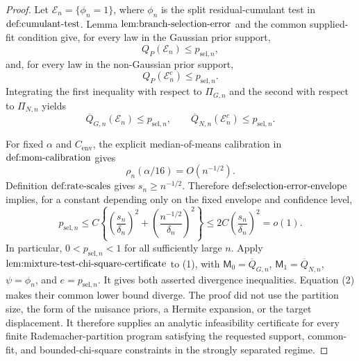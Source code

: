 \documentclass{article}
\begin{document}
\begin{proof}
Let \(\mathcal E_n=\{\phi_n=1\}\), where \(\phi_n\) is the split residual-cumulant test in \(\textup{def:cumulant-test}\).  Lemma \(\textup{lem:branch-selection-error}\) and the common supplied-fit condition give, for every law in the Gaussian prior support,
\[
 Q_P(\mathcal E_n)\le p_{\mathrm{sel},n},
\]
and, for every law in the non-Gaussian prior support,
\[
 Q_P(\mathcal E_n^c)\le p_{\mathrm{sel},n}.
\]
Integrating the first inequality with respect to \(\Pi_{G,n}\) and the second with respect to \(\Pi_{N,n}\) yields
\[
 \overline Q_{G,n}(\mathcal E_n)\le p_{\mathrm{sel},n},
 \qquad
 \overline Q_{N,n}(\mathcal E_n^c)\le p_{\mathrm{sel},n}.
\tag{1}
\]

For fixed \(\alpha\) and \(C_{\mathrm{env}}\), the explicit median-of-means calibration in \(\textup{def:mom-calibration}\) gives
\[
 \rho_n(\alpha/16)=O(n^{-1/2}).
\]
Definition \(\textup{def:rate-scales}\) gives \(s_n\ge n^{-1/2}\).  Therefore \(\textup{def:selection-error-envelope}\) implies, for a constant depending only on the fixed envelope and confidence level,
\[
 p_{\mathrm{sel},n}
 \le C\left\{
 \left(\frac{s_n}{\delta_n}\right)^2
 + \left(\frac{n^{-1/2}}{\delta_n}\right)^2
 \right\}
 \le 2C\left(\frac{s_n}{\delta_n}\right)^2
 =o(1).
\tag{2}
\]
In particular, \(0<p_{\mathrm{sel},n}<1\) for all sufficiently large \(n\).  Apply \(\textup{lem:mixture-test-chi-square-certificate}\) to (1), with \(\mathsf M_0=\overline Q_{G,n}\), \(\mathsf M_1=\overline Q_{N,n}\), \(\psi=\phi_n\), and \(e=p_{\mathrm{sel},n}\).  It gives both asserted divergence inequalities.  Equation (2) makes their common lower bound diverge.  The proof did not use the partition size, the form of the nuisance priors, a Hermite expansion, or the target displacement.  It therefore supplies an analytic infeasibility certificate for every finite Rademacher-partition program satisfying the requested support, common-fit, and bounded-chi-square constraints in the strongly separated regime.
\end{proof}
\end{document}

